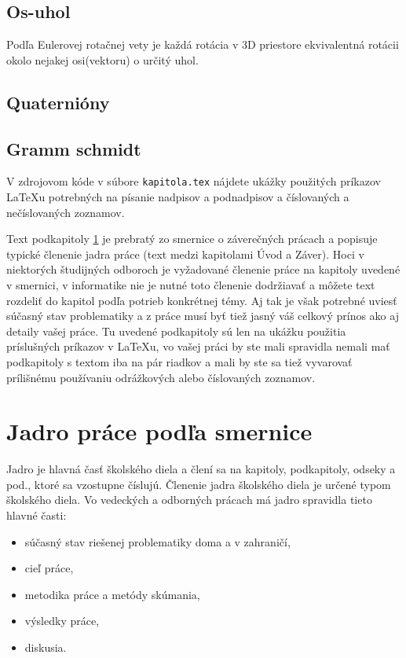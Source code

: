 \subsection{Os-uhol}
Podľa Eulerovej rotačnej vety je každá rotácia v 3D priestore ekvivalentná rotácii okolo nejakej osi(vektoru) o určitý uhol.


\subsection{Quaternióny}

\subsection{Gramm schmidt}





V
zdrojovom kóde v súbore \verb'kapitola.tex' nájdete ukážky použitých
príkazov LaTeXu potrebných na písanie nadpisov a podnadpisov a
číslovaných a nečíslovaných zoznamov.

Text podkapitoly \ref{sec:jadro} je
prebratý zo smernice o záverečných prácach \cite[článok 5]{smernica} a popisuje typické členenie jadra práce (text medzi kapitolami Úvod a Záver). Hoci v niektorých študijných odboroch je vyžadované členenie práce na kapitoly uvedené v smernici, v informatike nie je nutné toto členenie dodržiavať a môžete text rozdeliť do kapitol podľa potrieb konkrétnej témy. Aj tak je však potrebné uviesť súčasný stav problematiky a z práce musí byť tiež jasný váš celkový prínos ako aj detaily vašej práce. Tu uvedené podkapitoly sú len na ukážku použitia príslušných príkazov v LaTeXu, vo vašej práci by ste mali spravidla nemali mať podkapitoly s textom iba na pár riadkov a mali by ste sa tiež vyvarovať prílišnému používaniu odrážkových alebo číslovaných zoznamov.

\section{Jadro práce podľa smernice}
\label{sec:jadro}
Jadro je hlavná časť školského diela a člení sa na kapitoly,
podkapitoly, odseky a pod., ktoré sa vzostupne číslujú.
Členenie jadra školského diela je určené typom  školského diela. Vo vedeckých 
a odborných prácach má jadro spravidla tieto hlavné časti:
\begin{itemize}
\item  súčasný stav riešenej problematiky doma a v zahraničí,
\item  cieľ práce,
\item  metodika práce a metódy skúmania,
\item  výsledky práce, 
\item  diskusia. 
\end{itemize}


